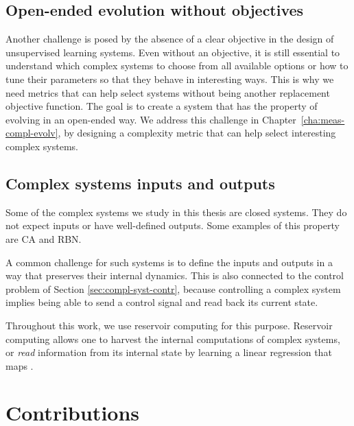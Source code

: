 \subsection{Open-ended evolution without
  objectives}\label{sec:open-ended-evolution}

Another challenge is posed by the absence of a clear objective in the design of
unsupervised learning systems. Even without an objective, it is still essential
to understand which complex systems to choose from all available options or how
to tune their parameters so that they behave in interesting ways. This is why we
need metrics that can help select systems without being another replacement
objective function. The goal is to create a system that has the property of
evolving in an open-ended way. We address this challenge in
Chapter~\ref{cha:meas-compl-evolv}, by designing a complexity metric that can
help select interesting complex systems.

\subsection{Complex systems inputs and outputs}

Some of the complex systems we study in this thesis are closed systems. They do
not expect inputs or have well-defined outputs. Some examples of this
property are \ac{CA} and \ac{RBN}.

A common challenge for such
systems is to define the inputs and outputs in a way that preserves their internal
dynamics. This is also connected to the control problem of Section
\ref{sec:compl-syst-contr}, because controlling a complex system implies being
able to send a control signal and read back its current state.

Throughout this work, we use reservoir computing for this purpose.
Reservoir computing allows one to harvest the internal computations of complex
systems, or \emph{read} information from its internal state by learning a linear
regression that maps .


\section{Contributions}

